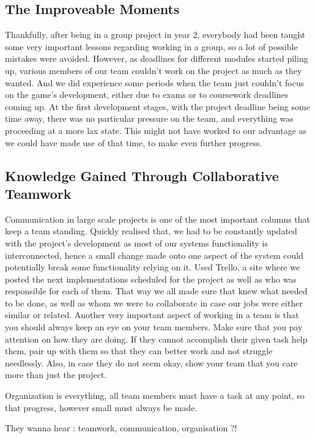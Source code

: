 \documentclass[11pt,a4paper]{article}
\begin{document}
        \subsection{The Improveable Moments}
        Thankfully, after being in a group project in year 2, everybody had been taught some very important lessons regarding working in a group, so a lot of possible mistakes were avoided.
        However, as deadlines for different modules started piling up, various members of our team couldn't work on the project as much as they wanted. And we did experience some periods when the team just couldn't focus on the game's development, either due to exams or to coursework deadlines coming up.
        At the first development stages, with the project deadline being some time away, there was no particular pressure on the team, and everything was proceeding at a more lax state. This might not have worked to our advantage as we could have made use of that time, to make even further progress.  


        \subsection{Knowledge Gained Through Collaborative Teamwork}
        Communication in large scale projects is one of the most important columns that keep a team standing. Quickly realised that, we had to be constantly updated with the project's development as most of our systems functionality is interconnected, hence a small change made onto one aspect of the system could potentially break some functionality relying on it. 
        Used Trello, a site where we posted the next implementations scheduled for the project as well as who was responsible for each of them. That way we all made sure that knew what needed to be done, as well as whom we were to collaborate in case our jobs were either similar or related.
        Another very important aspect of working in a team is that you should always keep an eye on your team members. Make sure that you pay attention on how they are doing. If they cannot accomplish their given task help them, pair up with them so that they can better work and not struggle needlessly. Also, in case they do not seem okay, show your team that you care more than just the project.
         
        Organization is everything, all team members must have a task at any point, so that progress, however small must always be made. 

        They wanna hear : teamwork, communication, organisation ?!
\end{document}
